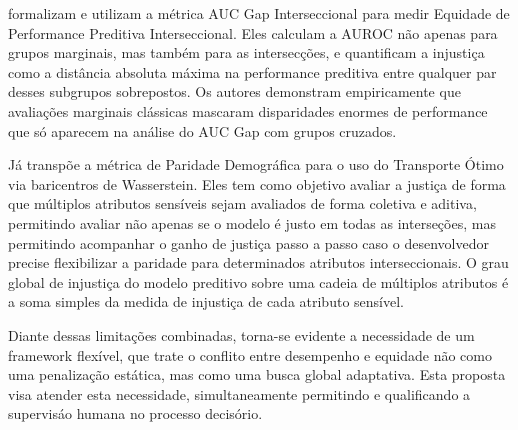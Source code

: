 \citet{gardner2023cross} formalizam e utilizam a métrica AUC Gap Interseccional para medir Equidade de Performance Preditiva Interseccional. Eles calculam a AUROC não apenas para grupos marginais, mas também para as intersecções, e quantificam a injustiça como a distância absoluta máxima na performance preditiva entre qualquer par desses subgrupos sobrepostos. Os autores demonstram empiricamente que avaliações marginais clássicas mascaram disparidades enormes de performance que só aparecem na análise do AUC Gap com grupos cruzados.

Já \citet{hu2024sequentially} transpõe a métrica de Paridade Demográfica para o uso do Transporte Ótimo via baricentros de Wasserstein. Eles tem como objetivo avaliar a justiça de forma que múltiplos atributos sensíveis sejam avaliados de forma coletiva e aditiva, permitindo avaliar não apenas se o modelo é justo em todas as interseções, mas permitindo acompanhar o ganho de justiça passo a passo caso o desenvolvedor precise flexibilizar a paridade para determinados atributos interseccionais. O grau global de injustiça do modelo preditivo sobre uma cadeia de múltiplos atributos é a soma simples da medida de injustiça de cada atributo sensível.

Diante dessas limitações combinadas, torna-se evidente a necessidade de um framework flexível, que trate o conflito entre desempenho e equidade não como uma penalização estática, mas como uma busca global adaptativa. Esta proposta visa atender esta necessidade, simultaneamente permitindo e qualificando a supervisáo humana no processo decisório. %

